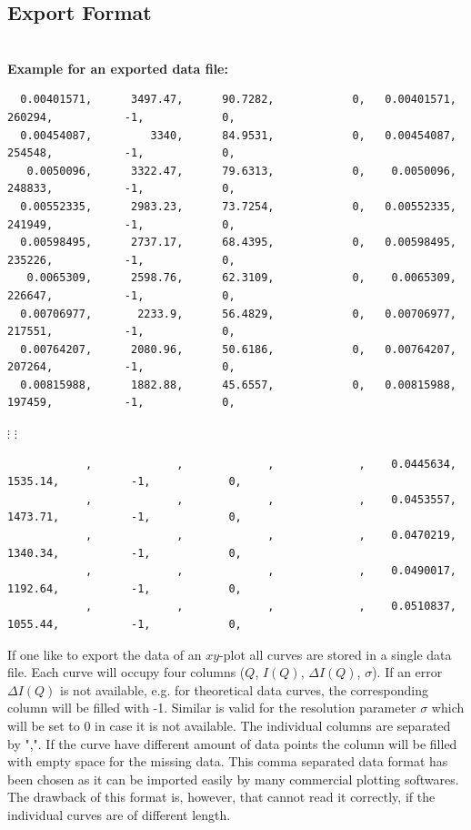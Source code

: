 \vspace{1cm}

\subsection{Export Format} \hspace{1pt}\\

\noindent
{\bf Example for an exported data file:}\\
{\tiny
\begin{verbatim}
  0.00401571,      3497.47,      90.7282,            0,   0.00401571,       260294,           -1,            0,
  0.00454087,         3340,      84.9531,            0,   0.00454087,       254548,           -1,            0,
   0.0050096,      3322.47,      79.6313,            0,    0.0050096,       248833,           -1,            0,
  0.00552335,      2983.23,      73.7254,            0,   0.00552335,       241949,           -1,            0,
  0.00598495,      2737.17,      68.4395,            0,   0.00598495,       235226,           -1,            0,
   0.0065309,      2598.76,      62.3109,            0,    0.0065309,       226647,           -1,            0,
  0.00706977,       2233.9,      56.4829,            0,   0.00706977,       217551,           -1,            0,
  0.00764207,      2080.96,      50.6186,            0,   0.00764207,       207264,           -1,            0,
  0.00815988,      1882.88,      45.6557,            0,   0.00815988,       197459,           -1,            0,
\end{verbatim}
\centerline{$\vdots$ \hspace{5cm} $\vdots$}
\begin{verbatim}
            ,             ,             ,             ,    0.0445634,      1535.14,           -1,            0,
            ,             ,             ,             ,    0.0453557,      1473.71,           -1,            0,
            ,             ,             ,             ,    0.0470219,      1340.34,           -1,            0,
            ,             ,             ,             ,    0.0490017,      1192.64,           -1,            0,
            ,             ,             ,             ,    0.0510837,      1055.44,           -1,            0,
\end{verbatim}
} If one like to export the data of an $xy$-plot all curves are
stored in a single data file. Each curve will occupy four columns
($Q$, $I(Q)$, $\Delta I(Q)$, $\sigma$). If an error $\Delta I(Q)$ is
not available, e.g. for theoretical data curves, the corresponding
column will be filled with -1. Similar is valid for the resolution
parameter $\sigma$ which will be set to 0 in case it is not
available. The individual columns are separated by ",". If the curve
have different amount of data points the column will be filled with
empty space for the missing data. This comma separated data format
has been chosen as it can be imported easily by many commercial
plotting softwares. The drawback of this format is, however, that
\SASfit cannot read it correctly, if the individual curves are of
different length.
